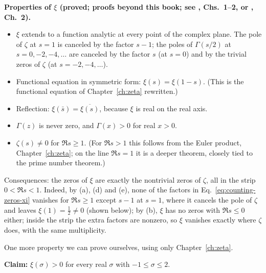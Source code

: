 \begin{beyond}
\textbf{Properties of $\xi$ (proved; proofs beyond this book; see \cite{edwards}, Chs.~1--2, or \cite{titchmarsh}, Ch.~2).}
\begin{itemize}
\item[(a)] $\xi$ extends to a function analytic at every point of the complex plane. The pole of $\zeta$ at $s=1$ is canceled by the factor $s-1$; the poles of $\Gamma(s/2)$ at $s=0,-2,-4,\dots$ are canceled by the factor $s$ (at $s=0$) and by the trivial zeros of $\zeta$ (at $s=-2,-4,\dots$).
\item[(b)] Functional equation in symmetric form: $\xi(s)=\xi(1-s)$. (This is the functional equation of Chapter~\ref{ch:zeta} rewritten.)
\item[(c)] Reflection: $\xi(\bar s)=\overline{\xi(s)}$, because $\xi$ is real on the real axis.
\item[(d)] $\Gamma(z)$ is never zero, and $\Gamma(x)>0$ for real $x>0$.
\item[(e)] $\zeta(s)\neq0$ for $\Re s\ge1$. (For $\Re s>1$ this follows from the Euler product, Chapter~\ref{ch:zeta}; on the line $\Re s=1$ it is a deeper theorem, closely tied to the prime number theorem.)
\end{itemize}
Consequences: the zeros of $\xi$ are exactly the nontrivial zeros of $\zeta$, all in the strip $0<\Re s<1$. Indeed, by (a), (d) and (e), none of the factors in Eq.~\eqref{eq:counting-zeros-xi} vanishes for $\Re s\ge1$ except $s-1$ at $s=1$, where it cancels the pole of $\zeta$ and leaves $\xi(1)=\tfrac12\neq0$ (shown below); by (b), $\xi$ has no zeros with $\Re s\le0$ either; inside the strip the extra factors are nonzero, so $\xi$ vanishes exactly where $\zeta$ does, with the same multiplicity.
\end{beyond}

One more property we can prove ourselves, using only Chapter~\ref{ch:zeta}.

\textbf{Claim:} $\xi(\sigma)>0$ for every real $\sigma$ with $-1\le\sigma\le2$.

